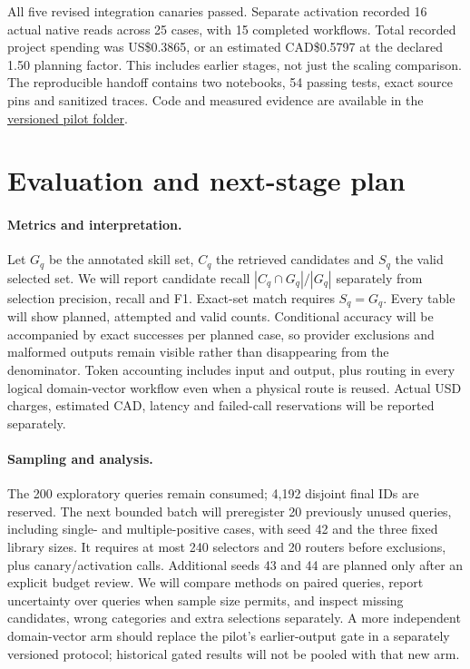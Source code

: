 \documentclass{article}
\begin{document}
All five revised integration canaries passed. Separate activation recorded 16
actual native reads across 25 cases, with 15 completed workflows. Total recorded
project spending was US\$0.3865, or an estimated CAD\$0.5797 at the declared 1.50
planning factor. This includes earlier stages, not just the scaling comparison.
The reproducible handoff contains two notebooks, 54 passing tests, exact source
pins and sanitized traces. Code and measured evidence are available in the
\href{https://github.com/speccy88/mia5150/tree/b9c9df2/skillret-pilot}{versioned pilot folder}.

\section{Evaluation and next-stage plan}
\paragraph{Metrics and interpretation.}
Let $G_q$ be the annotated skill set, $C_q$ the retrieved candidates and $S_q$ the
valid selected set. We will report candidate recall $|C_q\cap G_q|/|G_q|$ separately
from selection precision, recall and F1. Exact-set match requires $S_q=G_q$.
Every table will show planned, attempted and valid counts. Conditional accuracy
will be accompanied by exact successes per planned case, so provider exclusions
and malformed outputs remain visible rather than disappearing from the denominator.
Token accounting includes input and output, plus routing in every logical
domain-vector workflow even when a physical route is reused. Actual USD charges,
estimated CAD, latency and failed-call reservations will be reported separately.

\paragraph{Sampling and analysis.}
The 200 exploratory queries remain consumed; 4,192 disjoint final IDs are reserved.
The next bounded batch will preregister 20 previously unused queries, including
single- and multiple-positive cases, with seed 42 and the three fixed library
sizes. It requires at most 240 selectors and 20 routers before exclusions, plus
canary/activation calls. Additional seeds 43 and 44 are planned only after an
explicit budget review. We will compare methods on paired queries, report
uncertainty over queries when sample size permits, and inspect missing candidates,
wrong categories and extra selections separately. A more independent domain-vector
arm should replace the pilot's earlier-output gate in a separately versioned
protocol; historical gated results will not be pooled with that new arm.
\end{document}
